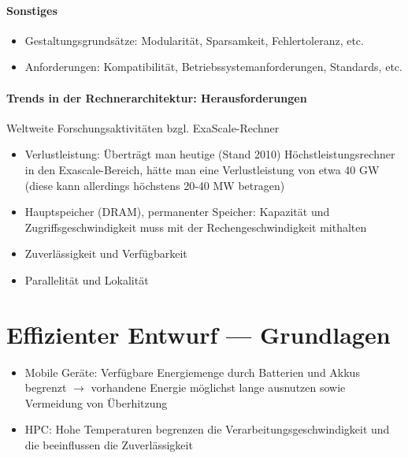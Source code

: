	\paragraph{Sonstiges}
		\begin{itemize}
			\item Gestaltungsgrundsätze: Modularität, Sparsamkeit, Fehlertoleranz, etc.
			\item Anforderungen: Kompatibilität, Betriebssystemanforderungen, Standards, etc.
		\end{itemize}

\paragraph{Trends in der Rechnerarchitektur: Herausforderungen}
Weltweite Forschungsaktivitäten bzgl. ExaScale-Rechner
\begin{itemize}
	\item Verlustleistung: Überträgt man heutige (Stand 2010) Höchstleistungsrechner in den Exascale-Bereich, hätte man eine Verlustleistung von etwa 40 GW (diese kann allerdings höchstens 20-40 MW betragen)
	\item Hauptspeicher (DRAM), permanenter Speicher: Kapazität und Zugriffsgeschwindigkeit muss mit der Rechengeschwindigkeit mithalten
	\item Zuverlässigkeit und Verfügbarkeit
	\item Parallelität und Lokalität
\end{itemize}


\section{Effizienter Entwurf --- Grundlagen}
	\begin{itemize}
		\item Mobile Geräte: Verfügbare Energiemenge durch Batterien und Akkus begrenzt \(\rightarrow\) vorhandene Energie möglichst lange ausnutzen sowie Vermeidung von Überhitzung
		\item HPC: Hohe Temperaturen begrenzen die Verarbeitungsgeschwindigkeit und die beeinflussen die Zuverlässigkeit
	\end{itemize}

